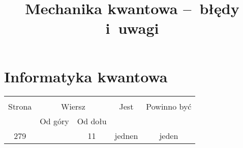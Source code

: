 \documentclass[a4paper,11pt]{article}
\title{Mechanika kwantowa --~błędy i~uwagi}
\begin{document}



\maketitle %



\section{Informatyka kwantowa}

\vspace{\spaceTwo}




\begin{center}
  \begin{tabular}{|c|c|c|c|c|}
    \hline
    & \multicolumn{2}{c|}{} & & \\
    Strona & \multicolumn{2}{c|}{Wiersz} & Jest
                              & Powinno być \\ \cline{2-3}
    & Od góry & Od dołu & & \\
    \hline
    279 & & 11 & jednen & jeden \\
    \hline
  \end{tabular}
\end{center}
\end{document}
